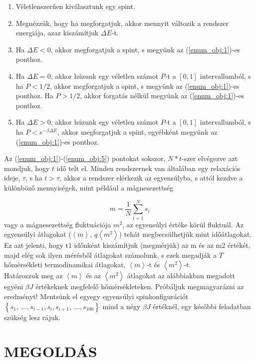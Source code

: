 \begin{enumerate}
    \item \label{enum_obj:1}Véletlenszerűen kiválasztunk egy spint.
    \item \label{enum_obj:2}Megnézzük, hogy ha megforgatjuk, akkor mennyit változik a rendszer energiája, azaz kiszámítjuk $\Delta E$-t.
    \item \label{enum_obj:3}Ha $\Delta E < 0$, akkor megforgatjuk a spint, s megyünk az (\ref{enum_obj:1})-es ponthoz.
    \item \label{enum_obj:4}Ha $\Delta E = 0$, akkor húzunk egy véletlen számot $P$-t a $\left[ 0, 1 \right]$ intervallumból, s ha $P < 1/2$, akkor megforgatjuk a spint, s megyünk az (\ref{enum_obj:1})-es ponthoz. Ha $P > 1/2$, akkor forgatás nélkül megyünk az (\ref{enum_obj:1})-es ponthoz.
    \item \label{enum_obj:5}Ha $\Delta E > 0$, akkor húzunk egy véletlen számot $P$-t a $\left[ 0, 1 \right]$ intervallumból, s ha $P < e^{-\beta \Delta E}$, akkor megforgatjuk a spint, egyébként megyünk az (\ref{enum_obj:1})-es ponthoz.
\end{enumerate}
Az (\ref{enum_obj:1})-(\ref{enum_obj:5}) pontokat sokszor, $N * t$-szer elvégezve azt mondjuk, hogy $t$ idő telt el. Minden rendszernek van általában egy relaxációs ideje, $\tau$, s ha $t > \tau$, akkor a rendszer elérkezik az egyensúlyba, s attól kezdve a különböző mennyiségek, mint például a mágnesezettség

\begin{equation*}
    m
    =
    \frac{1}{N} \sum_{i=1}^{N} s_{i}
\end{equation*}
vagy a mágnesezettség fluktuációja $m^{2}$, az egyensúlyi értéke körül fluktuál. Az egyensúlyi átlagokat ($\left< m \right>$, $q\left< m^{2} \right>$) tehát megbecsülhetjük mint időátlagokat. Ez azt jelenti, hogy t1 időnként kiszámítjuk (megmérjük) az m és az m2 értékét, majd elég sok ilyen mérésből átlagokat számolunk, s ezek megadják a $T$ hőmérsékleti termodinamikai átlagokat, $\left< m \right>$-t és $\left< m^{2} \right>$-t. \\
Határozzuk meg az $\left< m \right>$ és az $\left< m^{2} \right>$ átlagokat az alábbiakban megadott egyéni $\beta J$ értékeknek megfelelő hőmérsékleteken. Próbáljuk megmagyarázni az eredményt! Mentsünk el egyegy egyensúlyi spinkonfigurációt $\left\{ s_{1},\ \dots, s_{i-1}, s_{i} , s_{i+1},\ \dots, s_{100} \right\}$ mind a négy $\beta J$ értéknél, egy későbbi feladatban szükség lesz rájuk.

\section*{\bfseries\large\MakeUppercase{Megoldás}}

